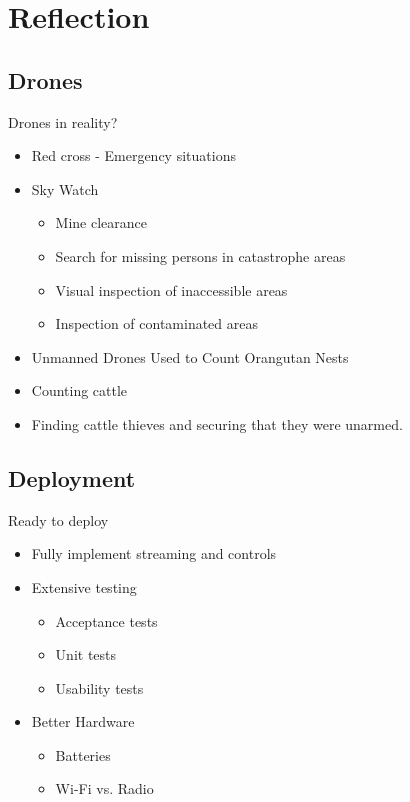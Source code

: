 
\author{Rasmus Steiniche}
\section{Reflection}
\subsection{Drones}
\begin{frame}{Drones in reality?}
\begin{itemize}
	\item Red cross - Emergency situations
	\item Sky Watch
	\begin{itemize}
		\item Mine clearance
		\item Search for missing persons in catastrophe areas
		\item Visual inspection of inaccessible areas
		\item Inspection of contaminated areas
	\end{itemize}
	\item Unmanned Drones Used to Count Orangutan Nests
	\item Counting cattle
	\item Finding cattle thieves and securing that they were unarmed.
\end{itemize}
\end{frame}

\subsection{Deployment}
\begin{frame}{Ready to deploy}
\begin{itemize}
	\item Fully implement streaming and controls
	\item Extensive testing
	\begin{itemize}
		\item Acceptance tests
		\item Unit tests
		\item Usability tests
	\end{itemize}
	\item Better Hardware
	\begin{itemize}
		\item Batteries
		\item Wi-Fi vs. Radio
	\end{itemize}
\end{itemize}
\end{frame}

